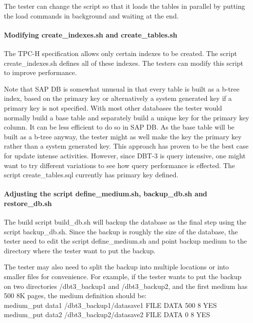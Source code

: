 \documentclass{article}
\begin{document}
\noindent
The tester can change the script so that it loads the tables in
parallel by putting the load commands in background and waiting at
the end.

\paragraph{Modifying create\_indexes.sh and create\_tables.sh}

\noindent
The TPC-H specification allows only certain indexes to be created.
The script create\_indexes.sh defines all of these indexes.  The
testers can modify this script to improve performance.

\noindent
Note that SAP DB is somewhat unusual in that every table is built as
a b-tree index, based on the primary key or alternatively a system
generated key if a primary key is not specified.  With most other
databases the tester would normally build a base table and separately
build a unique key for the primary key column.  It can be less
efficient to do so in SAP DB.  As the base table will be built as a
b-tree anyway, the tester might as well make the key the primary key
rather than a system generated key.  This approach has proven to be
the best case for update intense activities.  However, since DBT-3 is
query intensive, one might want to try different variations to see
how query performance is effected.  The script create\_tables.sql 
currently has primary key defined.

\paragraph{Adjusting the script define\_medium.sh, backup\_db.sh and restore\_db.sh}

\noindent
The build script build\_db.sh will backup the database as the final
step using the script backup\_db.sh.  Since the backup is roughly the
size of the database, the tester need to edit  the script
define\_medium.sh and point backup medium to the directory where the
tester want to put the backup.  

\noindent
The tester may also need to split the backup into multiple locations
or into smaller files for convenience.  For example, if the tester
wants to put the backup on two directories /dbt3\_backup1 and
/dbt3\_backup2, and the first medium has 500 8K pages, the medium
definition should be: \\
\indent medium\_put data1 /dbt3\_backup1/datasave1 FILE DATA 500 8 YES \\
\indent medium\_put data2 /dbt3\_backup2/datasave2 FILE DATA 0 8 YES
\end{document}

